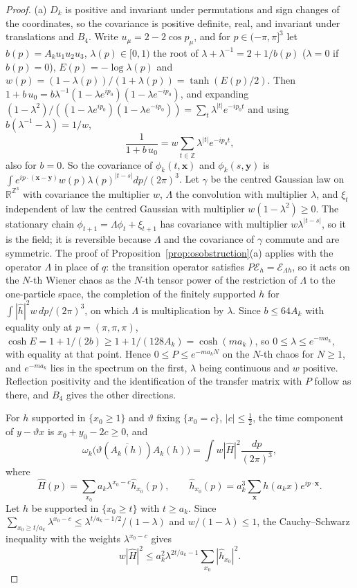 \documentclass[aps,prd,twocolumn,superscriptaddress,nofootinbib,longbibliography,floatfix,amsmath,amssymb,10pt]{revtex4-2}
\theoremstyle{definition}
\theoremstyle{remark}
\newcommand{\R}{\mathbb{R}}
\newcommand{\Z}{\mathbb{Z}}
\begin{document}
\begin{proof}
(a) $D_k$ is positive and invariant under permutations and sign changes of
the coordinates, so the covariance is positive definite, real, and
invariant under translations and $B_4$. Write $u_\mu=2-2\cos p_\mu$, and for
$p\in(-\pi,\pi]^3$ let $b(p)=A_ku_1u_2u_3$, $\lambda(p)\in[0,1)$ the root of
$\lambda+\lambda^{-1}=2+1/b(p)$ ($\lambda=0$ if $b(p)=0$), $E(p)=
-\log\lambda(p)$ and $w(p)=(1-\lambda(p))/(1+\lambda(p))=\tanh(E(p)/2)$. Then
$1+b\,u_0=b\lambda^{-1}(1-\lambda e^{ip_0})(1-\lambda e^{-ip_0})$, and
expanding $(1-\lambda^2)/((1-\lambda e^{ip_0})(1-\lambda e^{-ip_0}))=\sum_t
\lambda^{|t|}e^{-ip_0t}$ and using $b(\lambda^{-1}-\lambda)=1/w$,
\[
\frac1{1+b\,u_0}=w\sum_{t\in\Z}\lambda^{|t|}e^{-ip_0t},
\]
also for $b=0$. So the covariance of $\phi_k(t,\mathbf x)$ and $\phi_k(s,
\mathbf y)$ is $\int e^{ip\cdot(\mathbf x-\mathbf y)}w(p)\lambda(p)^{|t-s|}
dp/(2\pi)^3$. Let $\gamma$ be the centred Gaussian law on $\R^{\Z^3}$ with
covariance the multiplier $w$, $\Lambda$ the convolution with multiplier
$\lambda$, and $\xi_t$ independent of law the centred Gaussian with
multiplier $w(1-\lambda^2)\ge0$. The stationary chain $\phi_{t+1}=\Lambda
\phi_t+\xi_{t+1}$ has covariance with multiplier $w\lambda^{|t-s|}$, so it is
the field; it is reversible because $\Lambda$ and the covariance of
$\gamma$ commute and are symmetric. The proof of
Proposition~\ref{prop:osobstruction}(a) applies with the operator $\Lambda$
in place of $q$: the transition operator satisfies $P\mathcal E_h=
\mathcal E_{\Lambda h}$, so it acts on the $N$-th Wiener chaos as the $N$-th
tensor power of the restriction of $\Lambda$ to the one-particle space, the
completion of the finitely supported $h$ for $\int|\hat h|^2w\,dp/(2\pi)^3$,
on which $\Lambda$ is multiplication by $\lambda$. Since $b\le64A_k$ with
equality only at $p=(\pi,\pi,\pi)$, $\cosh E=1+1/(2b)\ge1+1/(128A_k)=
\cosh(ma_k)$, so $0\le\lambda\le e^{-ma_k}$, with equality at that point.
Hence $0\le P\le e^{-ma_kN}$ on the $N$-th chaos for $N\ge1$, and
$e^{-ma_k}$ lies in the spectrum on the first, $\lambda$ being continuous and
$w$ positive. Reflection positivity and the identification of the transfer
matrix with $P$ follow as there, and $B_4$ gives the other directions.

For $h$ supported in $\{x_0\ge1\}$ and $\vartheta$ fixing $\{x_0=c\}$,
$|c|\le\frac12$, the time component of $y-\vartheta x$ is $x_0+y_0-2c\ge0$,
and
\[
\omega_k\bigl(\vartheta(\overline{A_k(h)})A_k(h)\bigr)=\int w|\hat H|^2
\frac{dp}{(2\pi)^3},
\]
where
\[
\hat H(p)=\sum_{x_0}a_k\lambda^{x_0-c}\hat h_{x_0}(p),\qquad\hat h_{x_0}(p)
=a_k^3\sum_{\mathbf x}h(a_kx)e^{ip\cdot\mathbf x} .
\]
Let $h$ be supported in $\{x_0\ge t\}$ with $t\ge a_k$. Since
$\sum_{x_0\ge t/a_k}\lambda^{x_0-c}\le\lambda^{t/a_k-1/2}/(1-\lambda)$ and
$w/(1-\lambda)\le1$, the Cauchy--Schwarz inequality with the weights
$\lambda^{x_0-c}$ gives
\[
w|\hat H|^2\le a_k^2\lambda^{2t/a_k-1}\sum_{x_0}|\hat h_{x_0}|^2 .\tag{$*$}
\]


\end{proof}
\end{document}
